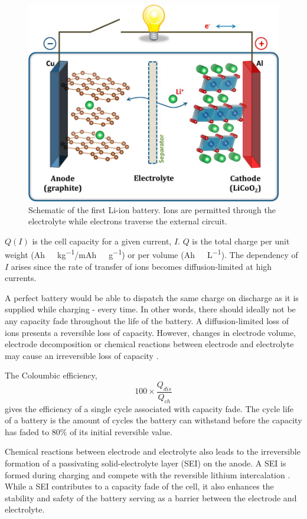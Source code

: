 \documentclass[Main/main.tex]{subfiles}
\begin{document}
\begin{figure}[ht]
	\centering
	\includegraphics[width=0.7\linewidth]{uploads/JACS}
	\caption{Schematic of the first Li-ion battery. Ions are permitted through the electrolyte while electrons traverse the external circuit.}
	\label{fig:2_jacs}
\end{figure}


$Q(I)$ is the cell capacity for a given current, $I$. $Q$ is the total charge per unit weight (\si{Ah\ kg^{-1}}/\si{mAh\ g^{-1}}) or per volume (\si{Ah\ L^{-1}}). The dependency of $I$ arises since the rate of transfer of ions becomes diffusion-limited at high currents. 

A perfect battery would be able to dispatch the same charge on discharge as it is supplied while charging - every time. In other words, there should ideally not be any capacity fade throughout the life of the battery. A diffusion-limited loss of ions presents a reversible loss of capacity. However, changes in electrode volume, electrode decomposition or chemical reactions between electrode and electrolyte may cause an irreversible loss of capacity \cite{2_Goodenough_perspective}.

The Coloumbic efficiency, \[ 100 \times \frac{Q_{dis}}{Q_{ch}} \] gives the efficiency of a single cycle associated with capacity fade. The cycle life of a battery is the amount of cycles the battery can withstand before the capacity has faded to $80\%$ of its initial reversible value.

Chemical reactions between electrode and electrolyte also leads to the irreversible formation of a passivating solid-electrolyte layer (SEI) on the anode. A SEI is formed during charging and compete with the reversible lithium intercalation \cite{2_SEI}. While a SEI contributes to a capacity fade of the cell, it also enhances the stability and safety of the battery serving as a barrier between the electrode and electrolyte.
\end{document}

